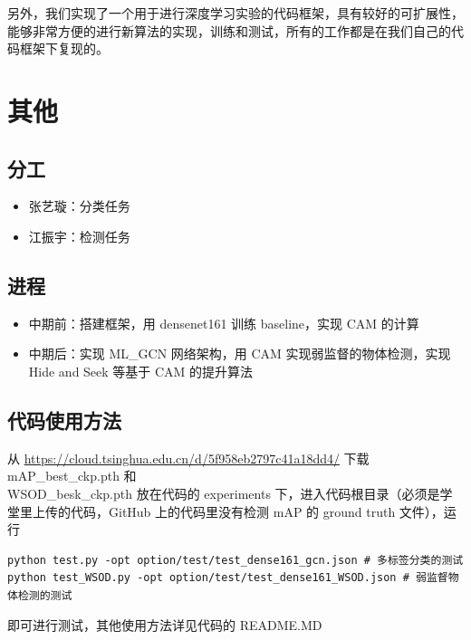 \documentclass[a4paper]{ctexart}
\begin{document}
另外，我们实现了一个用于进行深度学习实验的代码框架，具有较好的可扩展性，能够非常方便的进行新算法的实现，训练和测试，所有的工作都是在我们自己的代码框架下复现的。

\section{其他}
\subsection{分工}
\begin{itemize}
    \item 张艺璇：分类任务
    \item 江振宇：检测任务
\end{itemize}

\subsection{进程}
\begin{itemize}
    \item 中期前：搭建框架，用 densenet161 训练 baseline，实现 CAM 的计算
    \item 中期后：实现 ML\_GCN 网络架构，用 CAM 实现弱监督的物体检测，实现 Hide and Seek 等基于 CAM 的提升算法
\end{itemize}

\subsection{代码使用方法}
从 \url{https://cloud.tsinghua.edu.cn/d/5f958eb2797c41a18dd4/} 下载 mAP\_best\_ckp.pth 和  \\WSOD\_besk\_ckp.pth 放在代码的 experiments 下，进入代码根目录（必须是学堂里上传的代码，GitHub 上的代码里没有检测 mAP 的 ground truth 文件），运行

\begin{verbatim}
python test.py -opt option/test/test_dense161_gcn.json # 多标签分类的测试
python test_WSOD.py -opt option/test/test_dense161_WSOD.json # 弱监督物体检测的测试
\end{verbatim}

即可进行测试，其他使用方法详见代码的 README.MD



\end{document}
